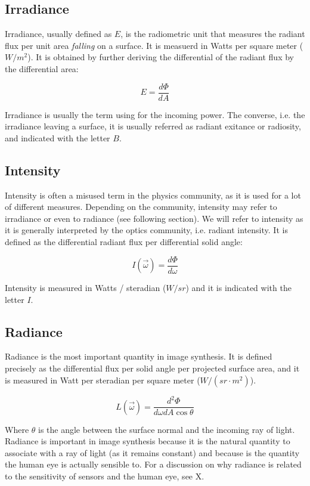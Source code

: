 \subsection{Irradiance}

Irradiance, usually defined as $E$, is the radiometric unit that measures the radiant flux per unit area \emph{falling} on a surface. It is measuerd in Watts per square meter ($W/m^2$). It is obtained by further deriving the differential of the radiant flux by the differential area:

$$
E = \frac{d\Phi}{dA}
$$

Irradiance is usually the term using for the incoming power. The converse, i.e. the irradiance leaving a surface, it is usually referred as radiant exitance or radiosity, and indicated with the letter $B$.
 
\subsection{Intensity}
Intensity is often a misused term in the physics community, as it is used for a lot of different measures. Depending on the community, intensity may refer to irradiance or even to radiance (see following section). We will refer to intensity as it is generally interpreted by the optics community, i.e. radiant intensity. It is defined as the differential radiant flux per differential solid angle:

$$
I(\vec{\omega}) = \frac{d \Phi}{d \omega}
$$

Intensity is measured in Watts / steradian ($W/sr$) and it is indicated with the letter $I$.

\subsection{Radiance}
Radiance is the most important quantity in image synthesis. It is defined precisely as the differential flux per solid angle per projected surface area, and it is measured in Watt per steradian per square meter ($W / (sr \cdot m^2)$).

$$
L(\vec{\omega}) = \frac{d^2 \Phi}{d\omega dA \cos \theta}
$$

Where $\theta$ is the angle between the surface normal and the incoming ray of light. Radiance is important in image synthesis because it is the natural quantity to associate with a ray of light (as it remains constant) and because is the quantity the human eye is actually sensible to. For a discussion on why radiance is related to the sensitivity of sensors and the human eye, see X.

